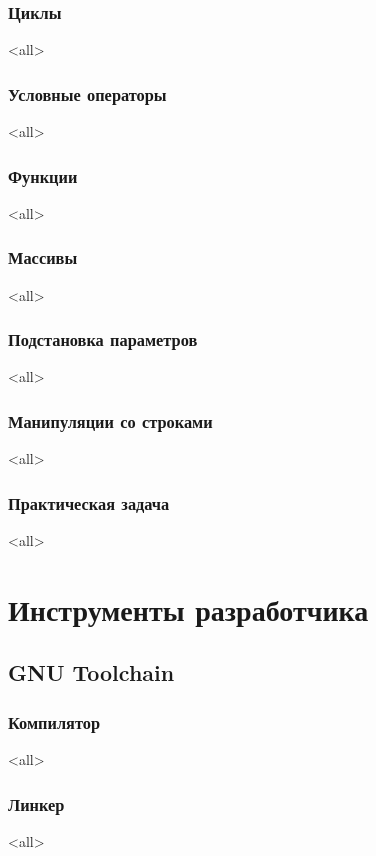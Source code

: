 \section{Циклы}
\mode<all>{}
\section{Условные операторы}
\mode<all>{}
\section{Функции}
\mode<all>{}
\section{Массивы}
\mode<all>{}
\section{Подстановка параметров}
\mode<all>{}
\section{Манипуляции со строками}
\mode<all>{}
\section{Практическая задача}
\mode<all>{}

\part{Инструменты разработчика}
\chapter{GNU Toolchain}
\section{Компилятор}
\mode<all>{}
\section{Линкер}
\mode<all>{}
